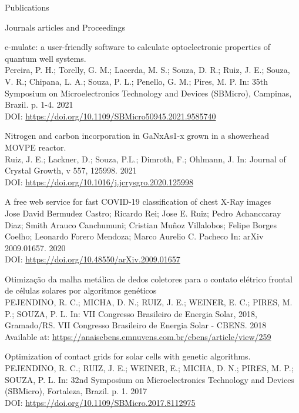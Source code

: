 \documentclass{resume} %
\begin{document}
\begin{rSection}{Publications}
\begin{rSubsection}{Journals articles and Proceedings}{}{}{}
            \item e-mulate: a user-friendly software to calculate optoelectronic properties of quantum well systems. \\ {\normalfont Pereira, P. H.; Torelly, G. M.; Lacerda, M. S.; Souza, D. R.; Ruiz, J. E.; Souza, V. R.; Chipana, L. A.; Souza, P. L.; Penello, G. M.; Pires, M. P.} In:  { 35th Symposium on Microelectronics Technology and Devices (SBMicro), Campinas, Brazil. p. 1-4. 2021} \\ DOI: {\normalfont  \url{https://doi.org/10.1109/SBMicro50945.2021.9585740               }}
            \item Nitrogen and carbon incorporation in GaNxAs1-x grown in a showerhead MOVPE reactor. \\ {\normalfont Ruiz, J. E.; Lackner, D.; Souza, P.L.; Dimroth, F.; Ohlmann, J.} In:  {\normalfont Journal of Crystal Growth, v 557, 125998. 2021} \\ DOI: {\normalfont  \url{https://doi.org/10.1016/j.jcrysgro.2020.125998}}
            \item A free web service for fast COVID-19 classification of chest X-Ray images \\ {\normalfont Jose David Bermudez Castro; Ricardo Rei; Jose E. Ruiz; Pedro Achanccaray Diaz; Smith Arauco Canchumuni; Cristian Muñoz Villalobos; Felipe Borges Coelho; Leonardo Forero Mendoza; Marco Aurelio C. Pacheco} In:  {\normalfont arXiv 2009.01657. 2020} \\ DOI: {\normalfont  \url{https://doi.org/10.48550/arXiv.2009.01657}}
            \item Otimização da malha metálica de dedos coletores para o contato elétrico frontal de células solares por algoritmos genéticos \\ {\normalfont PEJENDINO, R. C.; MICHA, D. N.; RUIZ, J. E.; WEINER, E. C.; PIRES, M. P.; SOUZA, P. L.} In:  {\normalfont VII Congresso Brasileiro de Energia Solar, 2018, Gramado/RS. VII Congresso Brasileiro de Energia Solar - CBENS. 2018} \\ Available at: {\normalfont  \url{https://anaiscbens.emnuvens.com.br/cbens/article/view/259}}
            \item Optimization of contact grids for solar cells with genetic algorithms. \\ {\normalfont PEJENDINO, R. C.; RUIZ, J. E.; WEINER, E.; MICHA, D. N.; PIRES, M. P.; SOUZA, P. L.} In:  {\normalfont 32nd Symposium on Microelectronics Technology and Devices (SBMicro), Fortaleza, Brazil. p. 1. 2017} \\ DOI: {\normalfont  \url{https://doi.org/10.1109/SBMicro.2017.8112975}}

\end{rSubsection}
\end{rSection}
\end{document}
